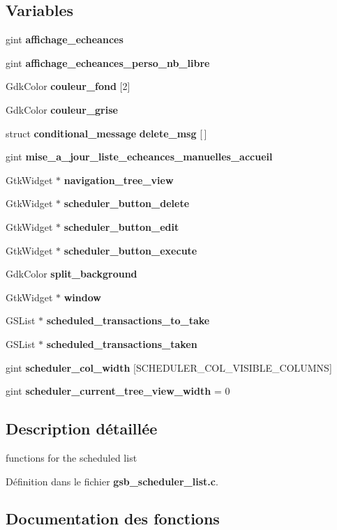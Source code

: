 \subsection*{Variables}
\begin{DoxyCompactItemize}
\item 
gint {\bf affichage\_\-echeances}
\item 
gint {\bf affichage\_\-echeances\_\-perso\_\-nb\_\-libre}
\item 
GdkColor {\bf couleur\_\-fond} [2]
\item 
GdkColor {\bf couleur\_\-grise}
\item 
struct {\bf conditional\_\-message} {\bf delete\_\-msg} [$\,$]
\item 
gint {\bf mise\_\-a\_\-jour\_\-liste\_\-echeances\_\-manuelles\_\-accueil}
\item 
GtkWidget $\ast$ {\bf navigation\_\-tree\_\-view}
\item 
GtkWidget $\ast$ {\bf scheduler\_\-button\_\-delete}
\item 
GtkWidget $\ast$ {\bf scheduler\_\-button\_\-edit}
\item 
GtkWidget $\ast$ {\bf scheduler\_\-button\_\-execute}
\item 
GdkColor {\bf split\_\-background}
\item 
GtkWidget $\ast$ {\bf window}
\item 
GSList $\ast$ {\bf scheduled\_\-transactions\_\-to\_\-take}
\item 
GSList $\ast$ {\bf scheduled\_\-transactions\_\-taken}
\item 
gint {\bf scheduler\_\-col\_\-width} [SCHEDULER\_\-COL\_\-VISIBLE\_\-COLUMNS]
\item 
gint {\bf scheduler\_\-current\_\-tree\_\-view\_\-width} = 0
\end{DoxyCompactItemize}


\subsection{Description détaillée}
functions for the scheduled list 

Définition dans le fichier {\bf gsb\_\-scheduler\_\-list.c}.



\subsection{Documentation des fonctions}
